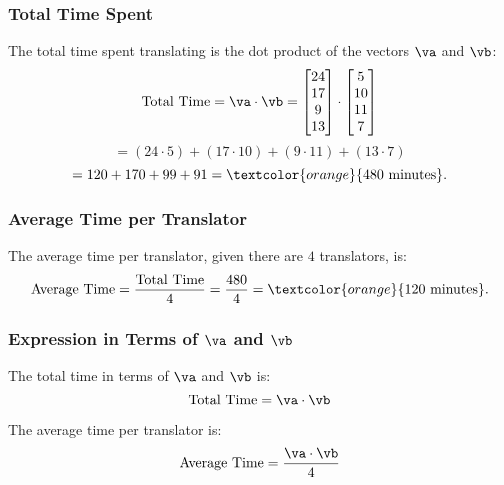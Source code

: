 \begin{sol}
    \subsubsection*{Total Time Spent}

    The total time spent translating is the dot product of the vectors \(\va\) and \(\vb\):
    \[
    \text{Total Time} = \va \cdot \vb = \begin{bmatrix} 24 \\ 17 \\ 9 \\ 13 \end{bmatrix} \cdot \begin{bmatrix} 5 \\ 10 \\ 11 \\ 7 \end{bmatrix}
    \]
    \[
    = (24 \cdot 5) + (17 \cdot 10) + (9 \cdot 11) + (13 \cdot 7)
    \]
    \[
    = 120 + 170 + 99 + 91 = \textcolor{orange}{480 \text{ minutes}}.
    \]
    
    \subsubsection*{Average Time per Translator}
    
    The average time per translator, given there are \(4\) translators, is:
    \[
    \text{Average Time} = \frac{\text{Total Time}}{4} = \frac{480}{4} = \textcolor{orange}{120 \text{ minutes}}.
    \]
    
    \subsubsection*{Expression in Terms of \(\va\) and \(\vb\)}
    
    The total time in terms of \(\va\) and \(\vb\) is:
    \[
    \text{Total Time} = \va \cdot \vb
    \]
    
    The average time per translator is:
    \[
    \text{Average Time} = \frac{\va \cdot \vb}{4}
    \]
\end{sol}


\medskip


